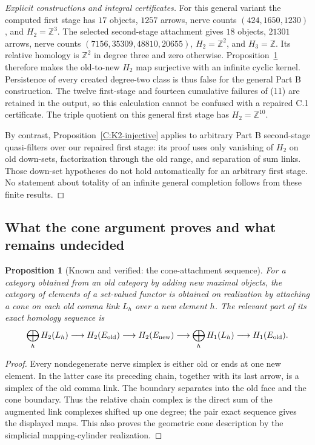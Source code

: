 \documentclass[11pt,a4paper]{article}
\newcommand{\Z}{\mathbb Z}
\newtheorem{proposition}[theorem]{Proposition}
\theoremstyle{definition}
\begin{document}
\begin{proof}[Explicit constructions and integral certificates]
For this general variant the computed first stage has $17$ objects,
$1257$ arrows, nerve counts $(424,1650,1230)$, and $H_2=\Z^3$.
The selected second-stage attachment gives $18$ objects, $21301$
arrows, nerve counts $(7156,35309,48810,20655)$, $H_2=\Z^2$,
and $H_3=\Z$. Its relative homology is $\Z^2$ in degree three
and zero otherwise. Proposition~\ref{C:attachments} therefore makes
the old-to-new $H_2$ map surjective with an infinite cyclic kernel.
Persistence of every created degree-two class is thus false for the
general Part B construction. The twelve first-stage and fourteen
cumulative failures of (11) are retained in the output, so this
calculation cannot be confused with a repaired C.1 certificate.
The triple quotient on this general first stage has $H_2=\Z^{10}$.

By contrast, Proposition~\ref{C:K2-injective} applies to arbitrary
Part B second-stage quasi-filters over our repaired first stage:
its proof uses only vanishing of $H_2$ on old down-sets,
factorization through the old range, and separation of sum links.
Those down-set hypotheses do not hold automatically for an arbitrary
first stage. No statement about totality of an infinite general
completion follows from these finite results.

\end{proof}

\subsection{What the cone argument proves and what remains undecided}
\begin{proposition}[Known and verified: the cone-attachment sequence]\label{C:attachments}
For a category obtained from an old category by adding new maximal objects, the category of elements of a set-valued functor is obtained on realization by attaching a cone on each old comma link $L_h$ over a new element $h$. The relevant part of its exact homology sequence is
\[
 \bigoplus_h H_2(L_h)\longrightarrow H_2(E_{\rm old})
 \longrightarrow H_2(E_{\rm new})
 \longrightarrow\bigoplus_h H_1(L_h)
 \longrightarrow H_1(E_{\rm old}).
\]
\end{proposition}
\begin{proof}
Every nondegenerate nerve simplex is either old or ends at one new element. In the latter case its preceding chain, together with its last arrow, is a simplex of the old comma link. The boundary separates into the old face and the cone boundary. Thus the relative chain complex is the direct sum of the augmented link complexes shifted up one degree; the pair exact sequence gives the displayed maps. This also proves the geometric cone description by the simplicial mapping-cylinder realization.\end{proof}
\end{document}

